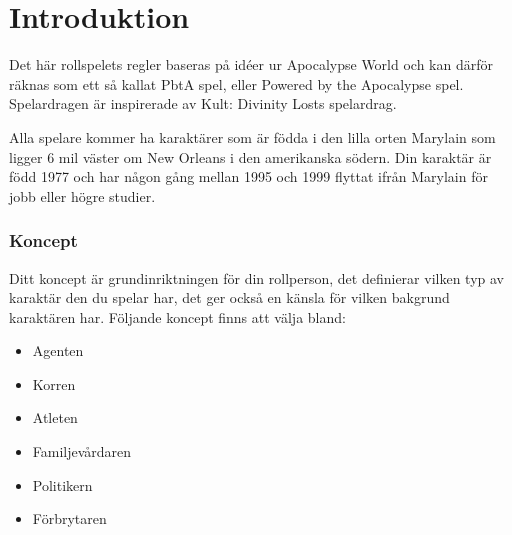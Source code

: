 \newcommand{\MyTitle}{De tillresta - Spelarbok}



\maketitle
\clearpage
\part{Introduktion}
Det här rollspelets regler baseras på idéer ur Apocalypse World och kan därför räknas som ett så kallat PbtA spel, eller Powered by the Apocalypse spel. Spelardragen är inspirerade av Kult: Divinity Losts spelardrag.

Alla spelare kommer ha karaktärer som är födda i den lilla orten Marylain som ligger 6 mil väster om New Orleans i den amerikanska södern. Din karaktär är född 1977 och har någon gång mellan 1995 och 1999 flyttat ifrån Marylain för jobb eller högre studier. 
\section{Koncept}
Ditt koncept är grundinriktningen för din rollperson, det definierar vilken typ av karaktär den du spelar har, det ger också en känsla för vilken bakgrund karaktären har. Följande koncept finns att välja bland:
\begin{itemize}
  \item Agenten
  \item Korren
  \item Atleten
  \item Familjevårdaren
  \item Politikern
  \item Förbrytaren
\end{itemize}
